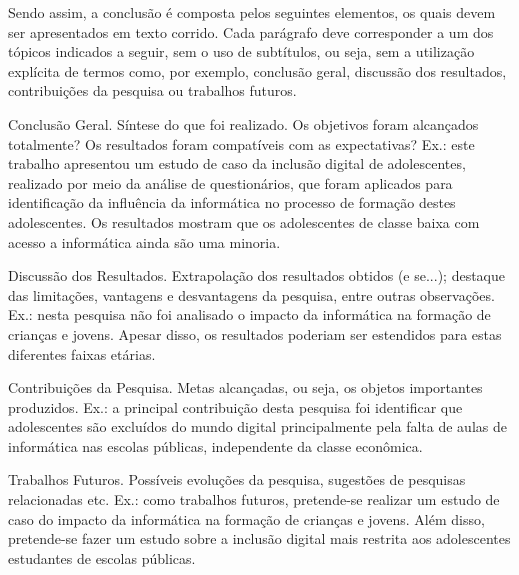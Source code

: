 Sendo assim, a conclusão é composta pelos seguintes elementos, os quais devem ser apresentados em texto corrido. Cada parágrafo deve corresponder a um dos tópicos indicados a seguir, sem o uso de subtítulos, ou seja, sem a utilização explícita de termos como, por exemplo, conclusão geral, discussão dos resultados, contribuições da pesquisa ou trabalhos futuros.

	Conclusão Geral. Síntese do que foi realizado. Os objetivos foram alcançados totalmente? Os resultados foram compatíveis com as expectativas?
	Ex.: este trabalho apresentou um estudo de caso da inclusão digital de adolescentes, realizado por meio da análise de questionários, que foram aplicados para identificação da influência da informática no processo de formação destes adolescentes. Os resultados mostram que os adolescentes de classe baixa com acesso a informática ainda são uma minoria.
	
 Discussão dos Resultados. Extrapolação dos resultados obtidos (e se...); destaque das limitações, vantagens e desvantagens da pesquisa, entre outras observações.
	Ex.: nesta pesquisa não foi analisado o impacto da informática na formação de crianças e jovens. Apesar disso, os resultados poderiam ser estendidos para estas diferentes faixas etárias.
	
 Contribuições da Pesquisa. Metas alcançadas, ou seja, os objetos importantes produzidos.
	Ex.: a principal contribuição desta pesquisa foi identificar que adolescentes são excluídos do mundo digital principalmente pela falta de aulas de informática nas escolas públicas, independente da classe econômica.
	
 Trabalhos Futuros. Possíveis evoluções da pesquisa, sugestões de pesquisas relacionadas etc.
	Ex.: como trabalhos futuros, pretende-se realizar um estudo de caso do impacto da informática na formação de crianças e jovens. Além disso, pretende-se fazer um estudo sobre a inclusão digital mais restrita aos adolescentes estudantes de escolas públicas.


